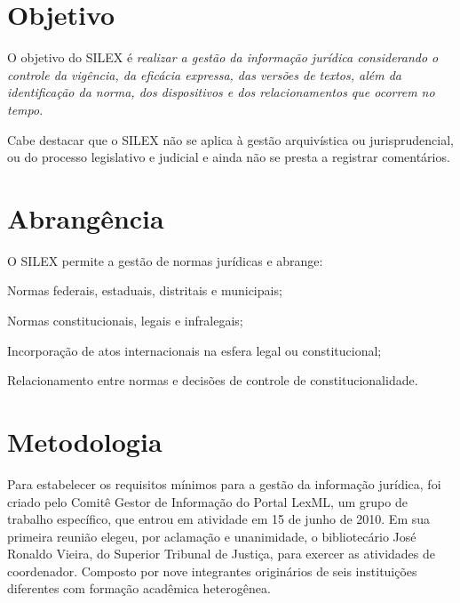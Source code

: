 \documentclass[a4paper,11pt,openright,twoside,brazil]{abntex2}
\begin{document}
\section{Objetivo}


O objetivo do SILEX é \emph{realizar a gestão da informação jurídica
considerando o controle da vigência, da eficácia expressa, das versões de
textos, além da identificação da norma, dos dispositivos e dos relacionamentos
que ocorrem no tempo}.

Cabe destacar que o SILEX não se aplica à gestão arquivística ou jurisprudencial, ou do processo
legislativo e judicial e ainda não se presta a registrar
comentários.

\section{Abrangência}

O SILEX permite a gestão de normas jurídicas e abrange:

\begin{alineas}
 \item Normas federais, estaduais, distritais e municipais;
 \item Normas constitucionais, legais e infralegais;
 \item Incorporação de atos internacionais na esfera legal ou constitucional;
 \item Relacionamento entre normas e decisões de controle de
 constitucionalidade.
\end{alineas}

\section{Metodologia}

Para estabelecer os requisitos mínimos para a gestão da informação jurídica, foi
criado pelo Comitê Gestor de Informação do Portal LexML, um grupo de trabalho
específico, que entrou em atividade em 15 de junho de 2010. Em sua primeira
reunião elegeu, por aclamação e unanimidade, o bibliotecário José Ronaldo
Vieira, do Superior Tribunal de Justiça, para exercer as atividades de
coordenador. Composto por nove integrantes originários de seis instituições
diferentes com formação acadêmica heterogênea.
\end{document}
